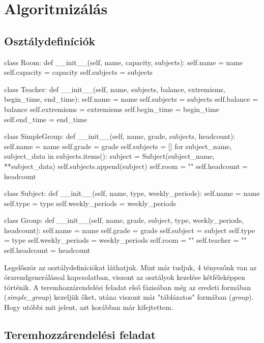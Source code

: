 \documentclass[12pt,a4paper]{report}
\begin{document}
\section{Algoritmizálás}

\subsection{Osztálydefiníciók}

\begin{python}
class Room:
    def __init__(self, name, capacity, subjects):
        self.name = name
        self.capacity = capacity
        self.subjects = subjects


class Teacher:
    def __init__(self, name, subjects, balance, extremisms, begin_time,
                 end_time):
        self.name = name
        self.subjects = subjects
        self.balance = balance
        self.extremisms = extremisms
        self.begin_time = begin_time
        self.end_time = end_time


class SimpleGroup:
    def __init__(self, name, grade, subjects, headcount):
        self.name = name
        self.grade = grade
        self.subjects = []
        for subject_name, subject_data in subjects.items():
            subject = Subject(subject_name, **subject_data)
            self.subjects.append(subject)
        self.room = ""
        self.headcount = headcount


class Subject:
    def __init__(self, name, type, weekly_periods):
        self.name = name
        self.type = type
        self.weekly_periods = weekly_periods


class Group:
    def __init__(self, name, grade, subject, type, weekly_periods,
                 headcount):
        self.name = name
        self.grade = grade
        self.subject = subject
        self.type = type
        self.weekly_periods = weekly_periods
        self.room = ""
        self.teacher = ""
        self.headcount = headcount
\end{python}

Legelőször az osztálydefiníciókat láthatjuk. Mint már tudjuk, 4 tényezőnk van az órarendgenerálással kapcsolatban, viszont az osztályok kezelése kétféleképpen történik. A teremhozzárendelési feladat első fázisában még az eredeti formában (\textit{simple\_group}) kezeljük őket, utána viszont már "táblázatos" formában (\textit{group}). Hogy utóbbi mit jelent, azt korábban már kifejtettem.

\subsection{Teremhozzárendelési feladat}
\end{document}
